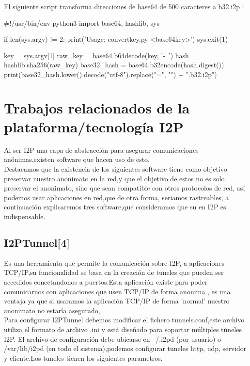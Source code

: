 \documentclass{article}
\begin{document}
 El siguiente script transforma direcciones de base64 de 500 caracteres a b32.i2p :
 
 \#!/usr/bin/env python3
import base64, hashlib, sys

if len(sys.argv) != 2:
  print('Usage: convertkey.py <base64key>')
  sys.exit(1)

key = sys.argv[1]
raw\_key = base64.b64decode(key, '-~')
hash = hashlib.sha256(raw\_key)
base32\_hash = base64.b32encode(hash.digest())
print(base32\_hash.lower().decode("utf-8").replace("=", "") + ".b32.i2p")
 

\pagebreak

\section{Trabajos relacionados de la plataforma/tecnología I2P}

Al ser  I2P una capa de abstracción para asegurar comunicaciones anónimas,existen software que hacen uso de esto.
\\

Destacamos que la existencia de los siguientes software tiene como objetivo preservar nuestro anonimato en la red,y que el objetivo de estos no es solo preservar
el anonimato, sino que sean compatible con otros protocolos de red, así podemos usar aplicaciones en red,que de otra forma, seriamos rastreables,
a continuación explicaremos tres software,que consideramos que su en I2P  es indispensable.
\subsection{I2PTunnel[4]}

Es una herramienta que permite la comunicación sobre I2P, a aplicaciones TCP/IP,su funcionalidad se basa en la creación de tuneles que pueden ser accedidos
conectandonos a puertos.Esta aplicación existe para poder comunicarnos con aplicaciones que usen TCP/IP de forma anonima , es una ventaja ya que si usaramos la aplicación TCP/IP de forma 'normal'
nuestro anonimato no estaría asegurado,
\\

Para configurar I2PTunnel debemos modificar el fichero tunnels.conf,este archivo utiliza el formato de archivo .ini y está diseñado para soportar múltiples túneles I2P. El archivo 
de configuración debe ubicarse en  ~/.i2pd (por usuario) o /var/lib/i2pd (en todo el sistema),podemos configurar tuneles http, udp, servidor y cliente.Los tuneles tienen los 
siguientes parametros.
\\
\end{document}
